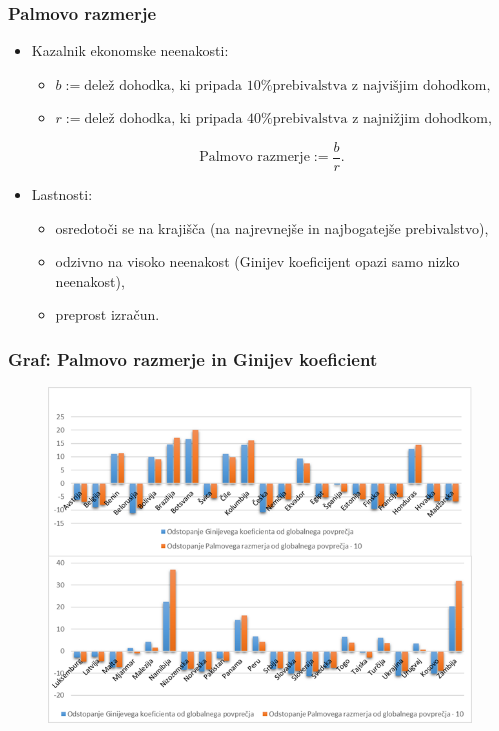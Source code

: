 \documentclass[10pt]{beamer}
\begin{document}
\begin{frame}
\frametitle{Palmovo razmerje}
\begin{itemize}
\item Kazalnik ekonomske neenakosti:

\begin{itemize}
\item $b := \textrm{delež dohodka, ki pripada 10\% prebivalstva z najvišjim dohodkom},$
\item $r := \textrm{delež dohodka, ki pripada 40\% prebivalstva z najnižjim dohodkom},$
\end{itemize}
$$
\textrm{Palmovo razmerje} := \frac{b}{r}.
$$

\item Lastnosti:
\begin{itemize}
\item osredotoči se na krajišča (na najrevnejše in najbogatejše prebivalstvo),
\item odzivno na visoko neenakost (Ginijev koeficijent opazi samo nizko neenakost),
\item preprost izračun.
\end{itemize}
\end{itemize}
\end{frame}

\begin{frame}
\frametitle{Graf: Palmovo razmerje in Ginijev koeficient}
\begin{figure}
\includegraphics[scale = 0.6]{./slike/gini_palma.png}
\end{figure}

\end{frame}
\end{document}
